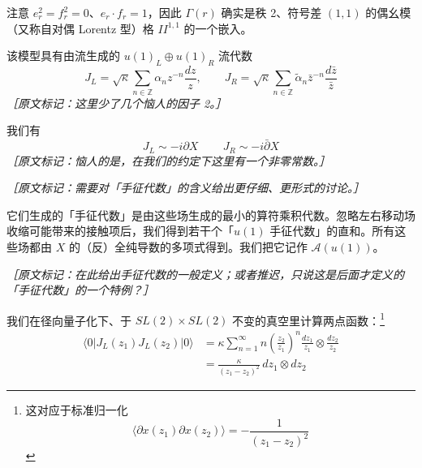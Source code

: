 注意 $e_r^2=f_r^2=0$、$e_r\cdot f_r=1$，因此 $\Gamma(r)$ 确实是秩 2、符号差 $(1,1)$ 的偶幺模（又称自对偶 Lorentz 型）格 $II^{1,1}$ 的一个嵌入。

该模型具有由流生成的 $u(1)_L\oplus u(1)_R$ 流代数
\begin{equation}
  J_L=\sqrt{\kappa}\sum_{n\in\mathbb{Z}}\alpha_nz^{-n}\frac{dz}{z},
  \qquad
  J_R=\sqrt{\kappa}\sum_{n\in\mathbb{Z}}\tilde\alpha_n\bar z^{-n}\frac{d\bar z}{\bar z}
  \tag{2.312}
  \label{eq:2.312}
\end{equation}
{\small\itshape ［原文标记：这里少了几个恼人的因子 2。］}

我们有
\begin{equation}
  J_L\sim-i\partial X\,\qquad J_R\sim-i\bar\partial X
  \tag{2.313}
  \label{eq:2.313}
\end{equation}
{\small\itshape ［原文标记：恼人的是，在我们的约定下这里有一个非零常数。］}

{\small\itshape ［原文标记：需要对「手征代数」的含义给出更仔细、更形式的讨论。］}

它们生成的「手征代数」是由这些场生成的最小的算符乘积代数。忽略左右移动场收缩可能带来的接触项后，我们得到若干个「$u(1)$ 手征代数」的直和。所有这些场都由 $X$ 的（反）全纯导数的多项式得到。我们把它记作 $\mathcal{A}(u(1))$。

{\small\itshape ［原文标记：在此给出手征代数的一般定义；或者推迟，只说这是后面才定义的「手征代数」的一个特例？］}

我们在径向量子化下、于 $SL(2)\times SL(2)$ 不变的真空里计算两点函数：\footnote{这对应于标准归一化
\begin{equation}
  \langle\partial x(z_1)\partial x(z_2)\rangle=-\frac{1}{(z_1-z_2)^2}
  \tag{2.314}
  \label{eq:2.314}
\end{equation}}
\begin{equation}
  \begin{aligned}
    \langle0|J_L(z_1)J_L(z_2)|0\rangle
    &=\kappa\sum_{n=1}^{\infty}n\left(\frac{z_2}{z_1}\right)^{n}\frac{dz_1}{z_1}\otimes\frac{dz_2}{z_2}\\
    &=\frac{\kappa}{(z_1-z_2)^2}\,dz_1\otimes dz_2
  \end{aligned}
  \tag{2.315}
  \label{eq:2.315}
\end{equation}

